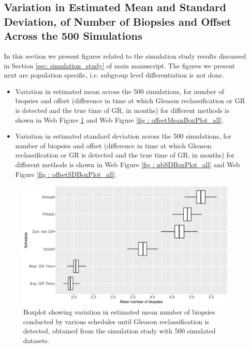\clearpage

\subsection{Variation in Estimated Mean and Standard Deviation, of Number of Biopsies and Offset Across the 500 Simulations}
In this section we present figures related to the simulation study results discussed in Section \ref{sec: simulation_study} of main manuscript. The figures we present next are population specific, i.e. subgroup level differentiation is not done.

\begin{itemize}
  \item Variation in estimated mean across the 500 simulations, for number of biopsies and offset (difference in time at which Gleason reclassification or GR is detected and the true time of GR, in months) for different methods is shown in Web Figure \ref{fig : nbMeanBoxPlot_all} and Web Figure \ref{fig : offsetMeanBoxPlot_all}.
  \item Variation in estimated standard deviation across the 500 simulations, for number of biopsies and offset (difference in time at which Gleason reclassification or GR is detected and the true time of GR, in months) for different methods is shown in Web Figure \ref{fig : nbSDBoxPlot_all} and Web Figure \ref{fig : offsetSDBoxPlot_all}.
\end{itemize}

\begin{figure}[!htb]
\centerline{\includegraphics[width=\columnwidth]{images/sim_study/nbMeanBoxPlot_all.eps}}
\caption{Boxplot showing variation in estimated mean number of biopsies conducted by various schedules until Gleason reclassification is detected, obtained from the simulation study with 500 simulated datasets.}
\label{fig : nbMeanBoxPlot_all}
\end{figure}

